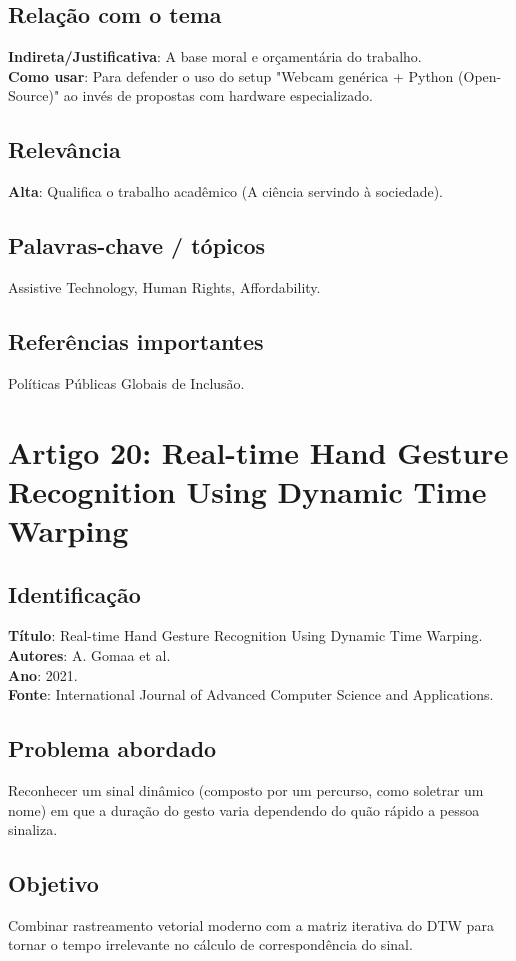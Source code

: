 \documentclass[12pt, a4paper]{article}
\begin{document}
\subsection{Relação com o tema}
\textbf{Indireta/Justificativa}: A base moral e orçamentária do trabalho.\\
\textbf{Como usar}: Para defender o uso do setup "Webcam genérica + Python (Open-Source)" ao invés de propostas com hardware especializado.\\
\subsection{Relevância}
\textbf{Alta}: Qualifica o trabalho acadêmico (A ciência servindo à sociedade).\\
\subsection{Palavras-chave / tópicos}
Assistive Technology, Human Rights, Affordability.\\
\subsection{Referências importantes}
Políticas Públicas Globais de Inclusão.
\newpage

\section{Artigo 20: Real-time Hand Gesture Recognition Using Dynamic Time Warping}
\subsection{Identificação}
\textbf{Título}: Real-time Hand Gesture Recognition Using Dynamic Time Warping.\\
\textbf{Autores}: A. Gomaa et al.\\
\textbf{Ano}: 2021.\\
\textbf{Fonte}: International Journal of Advanced Computer Science and Applications.\\
\subsection{Problema abordado}
Reconhecer um sinal dinâmico (composto por um percurso, como soletrar um nome) em que a duração do gesto varia dependendo do quão rápido a pessoa sinaliza.\\
\subsection{Objetivo}
Combinar rastreamento vetorial moderno com a matriz iterativa do DTW para tornar o tempo irrelevante no cálculo de correspondência do sinal.\\
\end{document}
